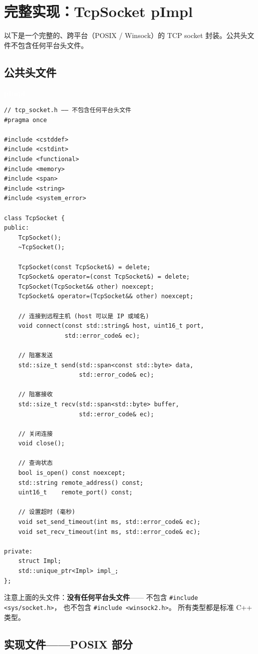\documentclass[12pt,a4paper,fontset=fandol]{ctexbook}
\newcommand{\Tp}[1]{\texttt{#1}}
\newcommand{\pimplabel}{%
  \noindent\begin{tcolorbox}[sharp corners,colback=pimplheadbg,colframe=pimplheadbg,
    left=6pt,right=6pt,top=2pt,bottom=2pt,boxrule=0pt]
  \textcolor{white}{\small\bfseries\sffamily pImpl}\end{tcolorbox}%
}
\begin{document}
\section{完整实现：TcpSocket pImpl}

以下是一个完整的、跨平台（POSIX / Winsock）的 TCP socket 封装。公共头文件不包含任何平台头文件。

\subsection{公共头文件}

\pimplabel
\begin{lstlisting}
// tcp_socket.h —— 不包含任何平台头文件
#pragma once

#include <cstddef>
#include <cstdint>
#include <functional>
#include <memory>
#include <span>
#include <string>
#include <system_error>

class TcpSocket {
public:
    TcpSocket();
    ~TcpSocket();

    TcpSocket(const TcpSocket&) = delete;
    TcpSocket& operator=(const TcpSocket&) = delete;
    TcpSocket(TcpSocket&& other) noexcept;
    TcpSocket& operator=(TcpSocket&& other) noexcept;

    // 连接到远程主机 (host 可以是 IP 或域名)
    void connect(const std::string& host, uint16_t port,
                 std::error_code& ec);

    // 阻塞发送
    std::size_t send(std::span<const std::byte> data,
                     std::error_code& ec);

    // 阻塞接收
    std::size_t recv(std::span<std::byte> buffer,
                     std::error_code& ec);

    // 关闭连接
    void close();

    // 查询状态
    bool is_open() const noexcept;
    std::string remote_address() const;
    uint16_t    remote_port() const;

    // 设置超时 (毫秒)
    void set_send_timeout(int ms, std::error_code& ec);
    void set_recv_timeout(int ms, std::error_code& ec);

private:
    struct Impl;
    std::unique_ptr<Impl> impl_;
};
\end{lstlisting}

注意上面的头文件：\textbf{没有任何平台头文件}——
不包含 \Tp{\#include <sys/socket.h>}，
也不包含 \Tp{\#include <winsock2.h>}。
所有类型都是标准 C++ 类型。

\subsection{实现文件——POSIX 部分}
\end{document}
